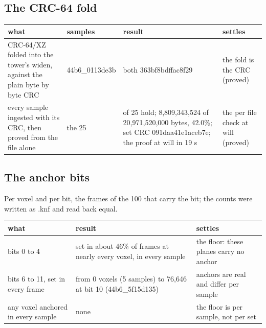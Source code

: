 \subsection{\texorpdfstring{The CRC-64 fold}{The CRC-64 fold}}

{\footnotesize
\setlength{\tabcolsep}{6pt}
\begin{longtable}{>{\RaggedRight\arraybackslash}p{}>{\RaggedRight\arraybackslash}p{}>{\RaggedRight\arraybackslash}p{}>{\RaggedRight\arraybackslash}p{}}
\toprule
what & samples & result & settles \\
\midrule
\endhead
CRC-64/XZ folded into the tower's widen, against the plain byte by byte CRC & 44b6\_\allowbreak{}0113de3b & both 363bf8bdffac8f29 & the fold is the CRC (proved) \\
every sample ingested with its CRC, then proved from the file alone & the 25 & 25 of 25 hold; 8,809,343,524 of 20,971,520,000 bytes, 42.0\%; set CRC 091daa41e1aceb7e; the proof at will in 19 s & the per file check at will (proved) \\
\bottomrule
\end{longtable}
}

\subsection{\texorpdfstring{The anchor bits}{The anchor bits}}

Per voxel and per bit, the frames of the 100 that carry the bit; the counts were written as .knf and read back equal.

{\small
\setlength{\tabcolsep}{6pt}
\begin{longtable}{>{\RaggedRight\arraybackslash}p{}>{\RaggedRight\arraybackslash}p{}>{\RaggedRight\arraybackslash}p{}}
\toprule
what & result & settles \\
\midrule
\endhead
bits 0 to 4 & set in about 46\% of frames at nearly every voxel, in every sample & the floor: these planes carry no anchor \\
bits 6 to 11, set in every frame & from 0 voxels (5 samples) to 76,646 at bit 10 (44b6\_\allowbreak{}5f15d135) & anchors are real and differ per sample \\
any voxel anchored in every sample & none & the floor is per sample, not per set \\
\bottomrule
\end{longtable}
}

